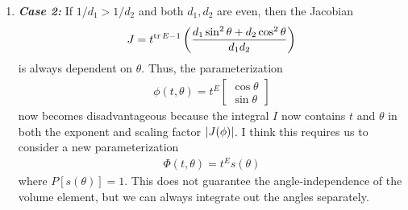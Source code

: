 \documentclass{article}
\theoremstyle{definition}
\newcommand{\f}[2]{\frac{#1}{#2}}
\newcommand{\lp}{\left(}
\newcommand{\rp}{\right)}
\begin{document}
\begin{enumerate}
\begin{enumerate}
			
			
		\item \textbf{\textit{Case 2:}} If $1/d_1 > 1/d_2$ and both $d_1,d_2$ are even, then the Jacobian
		\begin{align}
		J = t^{\tr E - 1}\lp \f{d_1\sin^2\theta + d_2 \cos^2\theta}{d_1d_2} \rp
		\end{align}
		is always dependent on $\theta$. Thus, the parameterization 
		\begin{align}
		\phi(t,\theta) = t^E\begin{bmatrix}
		\cos\theta \\ \sin\theta
		\end{bmatrix}
		\end{align}
		now becomes disadvantageous because the integral $I$ now contains $t$ and $\theta$ in both the exponent and scaling factor $\abs{J(\phi)}$. I think this requires us to consider a new parameterization
		\begin{align}
		\Phi(t,\theta) = t^E s(\theta)
		\end{align}
		where $P[s(\theta)] = 1$. This does not guarantee the angle-independence of the volume element, but we can always integrate out the angles separately. 
		

\end{enumerate}
\end{enumerate}
\end{document}
